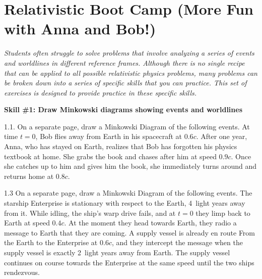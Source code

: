 \section{Relativistic Boot Camp (More Fun with Anna and Bob!)}

\makelabheader %

\bigskip

\textit{Students often struggle to solve problems that involve analyzing a series of events and worldlines in different reference frames.  Although there is no single recipe that can be applied to all possible relativistic physics problems, many problems can be broken down into a series of specific skills that you can practice.  This set of exercises is designed to provide practice in these specific skills.}

\textbf{Skill \#1: Draw Minkowski diagrams showing events and worldlines}

1.1. On a separate page, draw a Minkowski Diagram of the following events.  At time $t=0$, Bob flies away from Earth in his spacecraft at $0.6 c$.  After one year, Anna, who has stayed on Earth, realizes that Bob has forgotten his physics textbook at home.  She grabs the book and chases after him at speed $0.9 c$.  Once she catches up to him and gives him the book, she immediately turns around and returns home at $0.8 c$.  
\bigskip

1.3 On a separate page, draw a Minkowski Diagram of the following events.  The starship Enterprise is stationary with respect to the Earth, 4~light years away from it.  While idling, the ship's warp drive fails, and at $t=0$ they limp back to Earth at speed $0.4 c$.  At the moment they head towards Earth, they radio a message to Earth that they are coming.  A supply vessel is already en route From the Earth to the Enterprise at $0.6 c$, and they intercept the message when the supply vessel is exactly 2~light years away from Earth.  The supply vessel continues on course towards the Enterprise at the same speed until the two ships rendezvous.  
\bigskip

